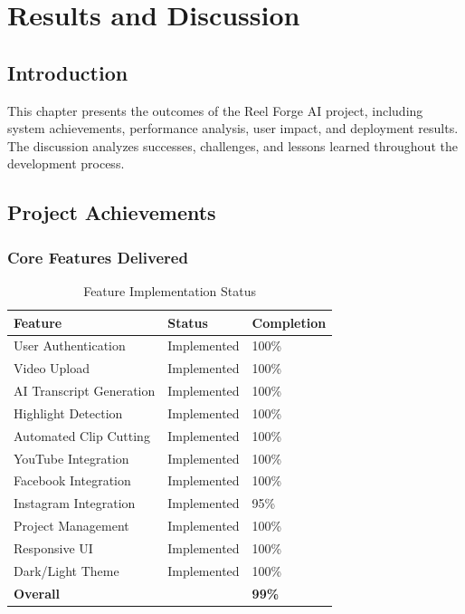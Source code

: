 \chapter{Results and Discussion}

\section{Introduction}

This chapter presents the outcomes of the Reel Forge AI project, including system achievements, performance analysis, user impact, and deployment results. The discussion analyzes successes, challenges, and lessons learned throughout the development process.

\section{Project Achievements}

\subsection{Core Features Delivered}

\begin{table}[H]
\centering
\caption{Feature Implementation Status}
\begin{tabular}{@{}lll@{}}
\toprule
\textbf{Feature} & \textbf{Status} & \textbf{Completion} \\
\midrule
User Authentication & Implemented & 100\% \\
Video Upload & Implemented & 100\% \\
AI Transcript Generation & Implemented & 100\% \\
Highlight Detection & Implemented & 100\% \\
Automated Clip Cutting & Implemented & 100\% \\
YouTube Integration & Implemented & 100\% \\
Facebook Integration & Implemented & 100\% \\
Instagram Integration & Implemented & 95\% \\
Project Management & Implemented & 100\% \\
Responsive UI & Implemented & 100\% \\
Dark/Light Theme & Implemented & 100\% \\
\midrule
\textbf{Overall} & & \textbf{99\%} \\
\bottomrule
\end{tabular}
\end{table}

